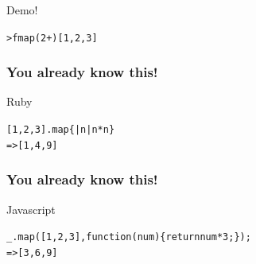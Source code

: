 \documentclass[12pt, xcolor=table]{beamer}
\begin{document}
\begin{frame}{Demo!}
        \begin{alltt}
            > fmap (2 +) [1,2,3]
        \end{alltt}
\end{frame}

\begin{frame}
    \frametitle{You already know this!}
    \begin{block}{Ruby}
        \begin{alltt}
            [1, 2, 3].map \{ |n| n * n \}
            \newline
            \newline
            => [1, 4, 9]
        \end{alltt}
    \end{block}
\end{frame}

\begin{frame}
    \frametitle{You already know this!}
    \begin{block}{Javascript}
        \begin{alltt}
            \_.map([1, 2, 3], function(num)\{return num*3;\});
            \newline
            \newline
            => [3, 6, 9]
        \end{alltt}
    \end{block}
\end{frame}
\end{document}
